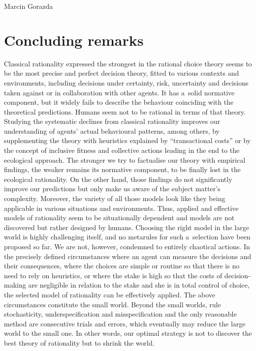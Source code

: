 \begin{artengenv}{Marcin Gorazda}
\section*{Concluding remarks}
Classical rationality expressed the strongest in the rational choice theory seems to be the most precise and perfect decision theory, fitted to various contexts and environments, including decisions under certainty, risk, uncertainty and decisions taken against or in collaboration with other agents. It has a~solid normative component, but it widely fails to describe the behaviour coinciding with the theoretical predictions. Humans seem not to be rational in terms of that theory. Studying the systematic declines from classical rationality improves our understanding of agents' actual behavioural patterns, among others, by supplementing the theory with heuristics explained by ``transactional costs'' or by the concept of inclusive fitness and collective actions leading in the end to the ecological approach. The stronger we try to factualise our theory with empirical findings, the weaker remains its normative component, to be finally lost in the ecological rationality. On the other hand, those findings do not significantly improve our predictions but only make us aware of the subject matter's complexity. Moreover, the variety of all those models look like they being applicable in various situations and environments. Thus, applied and effective models of rationality seem to be situationally dependent and models are not discovered but rather designed by humans. Choosing the right model in the large world is highly challenging itself, and no metarules for such a~selection have been proposed so far. We are not, however, condemned to entirely chaotical actions. In the precisely defined circumstances where an agent can measure the decisions and their consequences, where the choices are simple or routine so that there is no need to rely on heuristics, or where the stake is high so that the costs of decision-making are negligible in relation to the stake and she is in total control of choice, the selected model of rationality can be effectively applied. The above circumstances constitute the small world. Beyond the small worlds, rule stochasticity, underspecification and misspecification and the only reasonable method are consecutive trials and errors, which eventually may reduce the large world to the small one. In other words, our optimal strategy is not to discover the best theory of rationality but to shrink the world.

\end{artengenv}